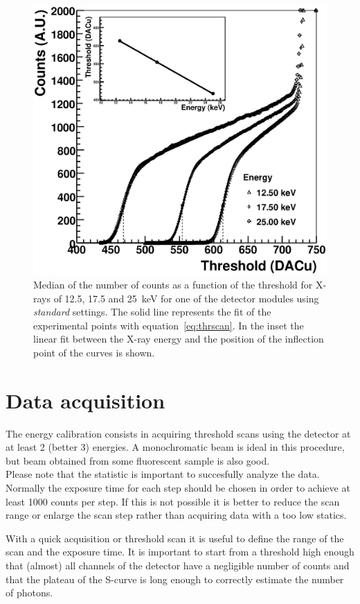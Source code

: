 \begin{figure}
\caption{Median of the number of counts as a function of the threshold for X-rays of 12.5, 17.5 and 25~keV for one of the detector modules using \textit{standard} settings. The solid line represents the fit of the experimental points with equation~\ref{eq:thrscan}. In the inset the linear fit between the X-ray energy and the position of the inflection point of the curves is shown.}\label{fig:modulecalibration}
\includegraphics[width=\textwidth]{fig8.eps}
\end{figure}
\newpage

\section{Data acquisition}

The energy calibration consists in acquiring threshold scans using the detector at at least 2 (better 3) energies. A monochromatic beam is ideal in this procedure, but beam obtained from some fluorescent sample is also good.\\
Please note that the statistic is important to succesfully analyze the data. Normally the exposure time for each step should be chosen in order to achieve at least 1000 counts per step.
If this is not possible it is better to reduce the scan range or enlarge the scan step rather than acquiring data with a too low statics.

With a quick acquisition or threshold scan it is useful to define the range of the scan and the exposure time. It is important to start from a threshold high enough that (almost) all channels of the detector have a negligible number of counts and that the plateau of the S-curve is long enough to correctly estimate the number of photons.

